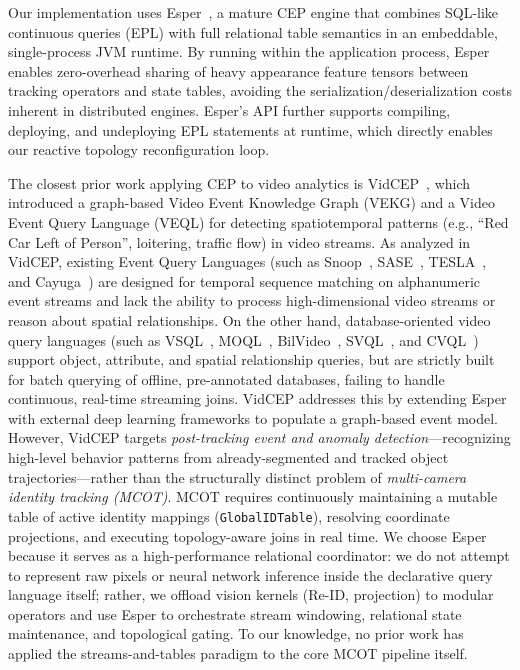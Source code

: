 \documentclass[review]{elsarticle}
\begin{document}
Our implementation uses Esper~\cite{espertech2024}, a mature CEP engine that combines SQL-like continuous queries (EPL) with full relational table semantics in an embeddable, single-process JVM runtime. By running within the application process, Esper enables zero-overhead sharing of heavy appearance feature tensors between tracking operators and state tables, avoiding the serialization/deserialization costs inherent in distributed engines. Esper's API further supports compiling, deploying, and undeploying EPL statements at runtime, which directly enables our reactive topology reconfiguration loop.

The closest prior work applying CEP to video analytics is VidCEP~\cite{yadav2019vidcep}, which introduced a graph-based Video Event Knowledge Graph (VEKG) and a Video Event Query Language (VEQL) for detecting spatiotemporal patterns (e.g., ``Red Car Left of Person'', loitering, traffic flow) in video streams. As analyzed in VidCEP, existing Event Query Languages (such as Snoop~\cite{chakravarthy1994snoop}, SASE~\cite{wu2006sase}, TESLA~\cite{cugola2010tesla}, and Cayuga~\cite{demers2007cayuga}) are designed for temporal sequence matching on alphanumeric event streams and lack the ability to process high-dimensional video streams or reason about spatial relationships. On the other hand, database-oriented video query languages (such as VSQL~\cite{moustafa2003video}, MOQL~\cite{li1997moql}, BilVideo~\cite{donderler2005bilvideo}, SVQL~\cite{lu2015svql}, and CVQL~\cite{le2008query}) support object, attribute, and spatial relationship queries, but are strictly built for batch querying of offline, pre-annotated databases, failing to handle continuous, real-time streaming joins. VidCEP addresses this by extending Esper with external deep learning frameworks to populate a graph-based event model. However, VidCEP targets \emph{post-tracking event and anomaly detection}---recognizing high-level behavior patterns from already-segmented and tracked object trajectories---rather than the structurally distinct problem of \emph{multi-camera identity tracking (MCOT)}. MCOT requires continuously maintaining a mutable table of active identity mappings (\texttt{GlobalIDTable}), resolving coordinate projections, and executing topology-aware joins in real time. We choose Esper because it serves as a high-performance relational coordinator: we do not attempt to represent raw pixels or neural network inference inside the declarative query language itself; rather, we offload vision kernels (Re-ID, projection) to modular operators and use Esper to orchestrate stream windowing, relational state maintenance, and topological gating. To our knowledge, no prior work has applied the streams-and-tables paradigm to the core MCOT pipeline itself.
\end{document}
